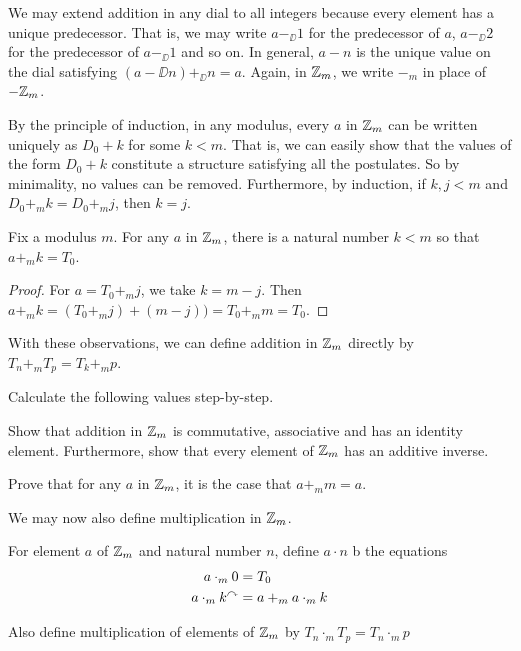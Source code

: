 We may extend addition in any dial to all integers because every element has a unique predecessor. That is, we may write $a-_\DD 1$ for the predecessor of $a$, $a-_\DD 2$ for the predecessor of $a-_\DD 1$ and so on. In general, $a-n$ is the unique value on the dial satisfying $(a-\DD n) +_\DD n = a$. Again, in ${\mathbb Z}_m$, we write $-_m$ in place of $-{{\mathbb Z}_m}$. 

By the principle of induction, in any modulus, every $a$ in ${\mathbb Z}_m$ can be written uniquely as $D_0 + k$ for some $k<m$.
That is, we can easily show that the values of the form $D_0 + k$ constitute a structure satisfying all the postulates. So by minimality, no values can be removed. Furthermore, by induction, if $k,j<m$ and $D_0 +_m k = D_0 +_m j$, then $k=j$. 

\begin{lem}
	Fix a modulus $m$. 
	For any $a$ in ${\mathbb Z}_m$, there is a natural number $k<m$ so that $a +_m k = T_0$. 	
	\begin{proof}
		For $a = T_0 +_m j$, we take $k = m-j$. Then $a +_m k = (T_0 +_m j) + (m-j)) = T_0 +_m m = T_0$.
	\end{proof}
\end{lem}

With these observations, we can define addition in ${\mathbb Z}_m$ directly by $T_n +_m T_p = T_k +_m p$. 

\begin{exer}
	\begin{exercise}
		\item Calculate the following values step-by-step.
		\begin{enumerate}
			\item $T_4 +_{5}} 4$
			\item $T_8+_{10}3$
			\item $(T_2 +_{7} 3) +_{7} T_2$
		\end{enumerate}
		\item Show that addition in $\ZZ_m$ is commutative, associative and has an identity element. Furthermore, show that every element of $\ZZ_m$ has an additive inverse.
		\item Prove that for any $a$ in $\ZZ_m$, it is the case that $a +_m m = a$.
	\end{exercise}
\end{exer}

We may now also define multiplication in ${\mathbb Z}_m$.

\begin{defn}
	For element $a$ of ${\mathbb Z}_m$ and natural number $n$, define $a\cdot n$ b the equations
	\begin{align*}
		a\cdot_m  0 &= T_0\\
		a\cdot_m k^\curvearrowright &= a +_m a\cdot_m k
	\end{align*}
	
	Also define multiplication of elements of ${\mathbb Z}_{m}$ by $T_n \cdot_m T_p = T_n\cdot_m p$
\end{defn}


